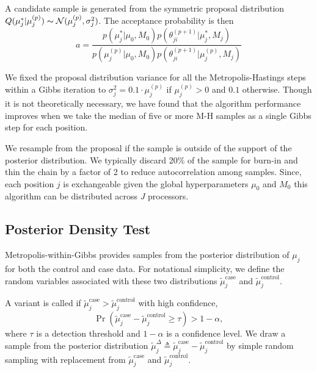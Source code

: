 \documentclass[11pt,reqno]{amsart}
\begin{document}
A candidate sample is generated from the symmetric proposal distribution $Q(\mu_j^* | \mu_j^{(p)}) \thicksim \mathcal{N}(\mu_j^{(p)}, \sigma_j^2)$. The acceptance probability is then
\begin{equation}
	a = \frac{ p(\mu_j^* | \mu_0, M_0) p(\theta^{(p+1)}_{ji} | \mu_j^*, M_j) } {p(\mu_j^{(p)} | \mu_0, M_0) p(\theta^{(p+1)}_{ji} | \mu_j^{(p)}, M_j)}
\end{equation}

We fixed the proposal distribution variance for all the Metropolis-Hastings steps within a Gibbs iteration to $\sigma_j^2 = 0.1 \cdot \mu_j^{(p)}$ if $\mu_j^{(p)} >0$ and $0.1$ otherwise. Though it is not theoretically necessary, we have found that the algorithm performance improves when we take the median of five or more M-H samples as a single Gibbs step for each position. 

We resample from the proposal if the sample is outside of the support of the posterior distribution. We typically discard 20\% of the sample for burn-in and thin the chain by a factor of 2 to reduce autocorrelation among samples. Since, each position $j$ is exchangeable given the global hyperparameters $\mu_0$ and $M_0$ this algorithm can be distributed across $J$ processors. 

\subsection{Posterior Density Test}\label{sec:hypothesis_test}
Metropolis-within-Gibbs provides samples from the posterior distribution of $\mu_j$ for both the control and case data. For notational simplicity, we define the random variables associated with these two distributions $\tilde{\mu}_j^{\text{case}}$ and $\tilde{\mu}_j^{\text{control}}$.

A variant is called if $\tilde{\mu}_j^{\text{case}} > \tilde{\mu}_j^{\text{control}}$ with high confidence,
\begin{equation}\label{eqn:bayes_test}
	\Pr( \tilde{\mu}_j^{\text{case}} - \tilde{\mu}_j^{\text{control}} \geq \tau ) > 1-\alpha,
\end{equation}
where $\tau$ is a detection threshold and $1-\alpha$ is a confidence level. We draw a sample from the posterior distribution $\tilde{\mu}_j^{\Delta} \triangleq \tilde{\mu}_j^{\text{case}} - \tilde{\mu}_j^{\text{control}}$ by simple random sampling with replacement from $\tilde{\mu}_j^{\text{case}}$ and $\tilde{\mu}_j^{\text{control}}$.
\end{document}
